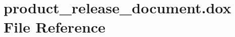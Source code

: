 \section{product\+\_\+release\+\_\+document.\+dox File Reference}
\label{product__release__document_8dox}
